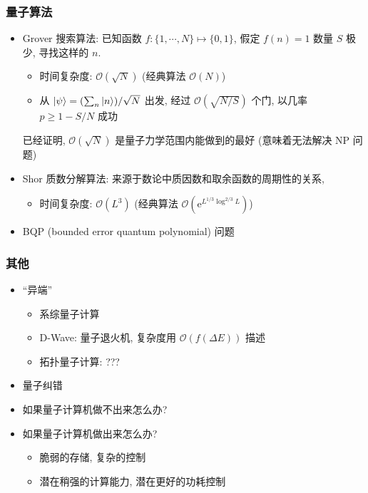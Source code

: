 \documentclass[12pt,hyperref={CJKbookmarks=true},aspectratio=169]{beamer}
\newcommand\e{\mathrm{e}} %
\begin{document}
\begin{frame}[t]\frametitle{量子算法}
\begin{itemize}
	\item Grover 搜索算法: 已知函数 $f:\{1, \cdots, N\}\mapsto \{0, 1\}$, 
	假定 $f(n) = 1$ 数量 $S$ 极少, 寻找这样的 $n$. 
	\begin{itemize}
		\item 时间复杂度: 
		$\mathcal O(\sqrt N)$ (经典算法 $\mathcal{O}(N)$)
		\item 从 $\ket\psi = (\sum_n \ket{n})/\sqrt{N}$ 出发, 
		经过 $\mathcal O(\sqrt{N/S})$ 个门, 以几率 $p \ge 1 - S/N$ 成功
	\end{itemize}
	已经证明, $\mathcal O(\sqrt{N})$ 是量子力学范围内能做到的最好 
	(意味着无法解决 NP 问题) \\
	\item Shor 质数分解算法: 来源于数论中质因数和取余函数的周期性的关系, 
	\begin{itemize}
		\item 时间复杂度: 
		$\mathcal O (L^3)$ (经典算法 $\mathcal O (\e^{L^{1/3}\log^{2/3} L})$)
	\end{itemize}
	\item BQP (bounded error quantum polynomial) 问题
\end{itemize}
\end{frame}

\begin{frame}[t]\frametitle{其他}
\begin{itemize}
	\item ``异端''
	\begin{itemize}
		\item 系综量子计算
		\item D-Wave: 量子退火机, 复杂度用 $\mathcal O(f(\Delta E))$ 描述
		\item 拓扑量子计算: ???
	\end{itemize}
	\item 量子纠错
	\item 如果量子计算机做不出来怎么办? 
	\item 如果量子计算机做出来怎么办? 
	\begin{itemize}
		\item 脆弱的存储, 复杂的控制
		\item 潜在稍强的计算能力, 潜在更好的功耗控制
	\end{itemize}
\end{itemize}
\end{frame}

\end{document}

